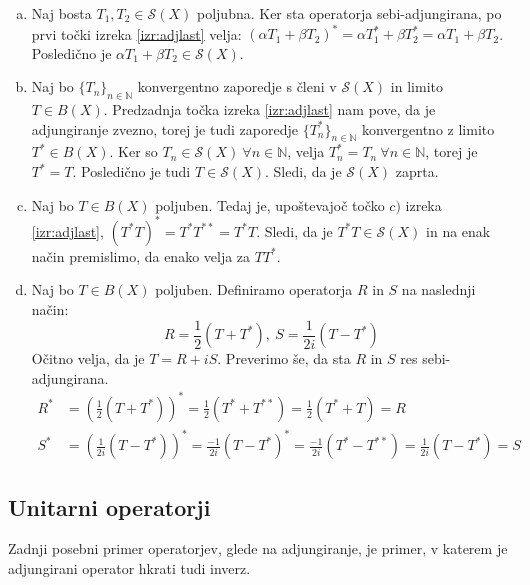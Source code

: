 \documentclass[mat2]{matdelo}
\newcommand{\N}{\mathbb{N}}
\begin{document}
			\begin{dokaz}
				\begin{enumerate}[a)]
					\item Naj bosta $T_1, T_2 \in \mathcal{S}(X)$ poljubna. Ker sta operatorja sebi-adjungirana, po prvi točki izreka \ref{izr:adjlast} velja: $(\alpha T_1 + \beta T_2)^* = \alpha T_1^* + \beta T_2^* = \alpha T_1 + \beta T_2$. Posledično je $\alpha T_1 + \beta T_2 \in \mathcal{S}(X)$.
					\item Naj bo $\{T_n\}_{n\in\N}$ konvergentno zaporedje s členi v $\mathcal{S}(X)$ in limito $T\in B(X)$. Predzadnja točka izreka \ref{izr:adjlast} nam pove, da je adjungiranje zvezno, torej je tudi zaporedje $\{T_n^*\}_{n\in\N}$ konvergentno z limito $T^* \in B(X)$. Ker so $T_n \in \mathcal{S}(X)~ \forall n\in \N$, velja $T_n^* = T_n~\forall n\in \N$, torej je $T^* = T$. Posledično je tudi $T\in \mathcal{S}(X)$. Sledi, da je $\mathcal{S}(X)$ zaprta.
					\item Naj bo $T\in B(X)$ poljuben. Tedaj je, upoštevajoč točko $c)$ izreka \ref{izr:adjlast}, $(T^*T)^* = T^*T^{**} = T^*T$. Sledi, da je $T^*T\in \mathcal{S}(X)$ in na enak način premislimo, da enako velja za $TT^*$.
					\item Naj bo $T\in B(X)$ poljuben. Definiramo operatorja $R$ in $S$ na naslednji način: $$R = \frac{1}{2}(T + T^*),~ S=\frac{1}{2i}(T - T^*)$$
					Očitno velja, da je $T = R + iS$. Preverimo še, da sta $R$ in $S$ res sebi-adjungirana.
					\begin{align*}
						R^* &= (\frac{1}{2}(T + T^*))^* = \frac{1}{2}(T^* + T^{**}) = \frac{1}{2}(T^* + T) = R \\
						S^* &= (\frac{1}{2i}(T - T^*))^* = \frac{-1}{2i}(T - T^*)^* = \frac{-1}{2i}(T^* - T^{**}) =\frac{1}{2i}(T - T^*) = S
					\end{align*}
				\end{enumerate}
			\end{dokaz}
			
			\subsection{Unitarni operatorji}
			Zadnji posebni primer operatorjev, glede na adjungiranje, je primer, v katerem je adjungirani operator hkrati tudi inverz.
			
\end{document}
